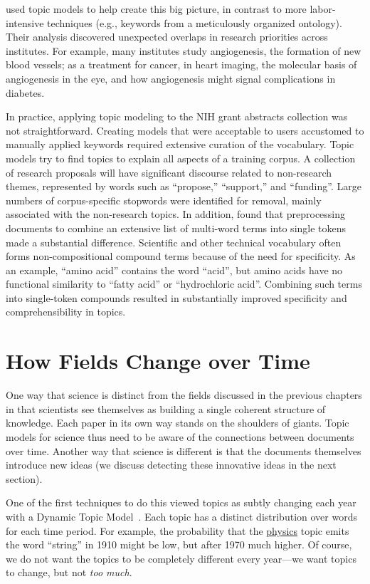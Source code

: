 \citet{talley-11} used topic models to help create this big picture,
in contrast to more labor-intensive techniques (e.g., keywords from a
meticulously organized ontology).  Their analysis discovered
unexpected overlaps in research priorities across institutes.  For
example, many institutes study angiogenesis, the formation of new
blood vessels; as a treatment for cancer, in heart imaging, the
molecular basis of angiogenesis in the eye, and how angiogenesis might
signal complications in diabetes.

In practice, applying topic modeling to the NIH grant abstracts collection was not straightforward.
Creating models that were acceptable to users accustomed to manually applied keywords required extensive curation of the vocabulary.
Topic models try to find topics to explain all aspects of a training corpus.
A collection of research proposals will have significant discourse related to non-research themes, represented by words such as ``propose,'' ``support,'' and ``funding''.
Large numbers of corpus-specific stopwords were identified for removal, mainly associated with the non-research topics.
In addition, \citet{talley-11} found that preprocessing documents to combine an extensive list of multi-word terms into single tokens made a substantial difference.
Scientific and other technical vocabulary often forms non-compositional compound terms because of the need for specificity.
As an example, ``amino acid'' contains the word ``acid'', but amino acids have no functional similarity to ``fatty acid'' or ``hydrochloric acid''.
Combining such terms into single-token compounds resulted in substantially improved specificity and comprehensibility in topics.

\section{How Fields Change over Time}
\label{sec:sci_change}

One way that science is distinct from the fields discussed in the
previous chapters in that scientists see themselves as building a single coherent structure of knowledge.  Each
paper in its own way stands on the shoulders of giants. Topic models
for science thus need to be aware of the connections between documents
over time.  Another way that science is different is that the
documents themselves introduce new ideas (we discuss detecting these
innovative ideas in the next section).

One of the first techniques to do this viewed topics as subtly
changing each year with a Dynamic Topic
Model~\citep[]{blei-06b}.  Each topic has a distinct
distribution over words for each time period.  For example, the probability that
the \underline{physics} topic emits the word ``string'' in 1910 might be low,
but after 1970 much higher.  Of course, we do not want the topics to be completely
different every year---we want topics to change, but not \emph{too
  much}.

